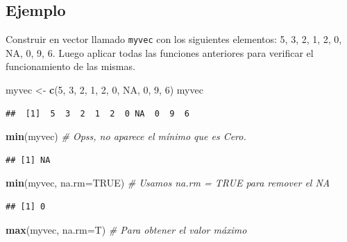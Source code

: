 \documentclass[10pt,]{krantz}
\makeatletter
\newenvironment{Shaded}{\begin{snugshade}}{\end{snugshade}}
\newcommand{\KeywordTok}[1]{\textcolor[rgb]{0.13,0.29,0.53}{\textbf{{#1}}}}
\newcommand{\DataTypeTok}[1]{\textcolor[rgb]{0.13,0.29,0.53}{{#1}}}
\newcommand{\DecValTok}[1]{\textcolor[rgb]{0.00,0.00,0.81}{{#1}}}
\newcommand{\StringTok}[1]{\textcolor[rgb]{0.31,0.60,0.02}{{#1}}}
\newcommand{\CommentTok}[1]{\textcolor[rgb]{0.56,0.35,0.01}{\textit{{#1}}}}
\newcommand{\OtherTok}[1]{\textcolor[rgb]{0.56,0.35,0.01}{{#1}}}
\newcommand{\NormalTok}[1]{{#1}}
\newenvironment{kframe}{%
\medskip{}
\setlength{\fboxsep}{.8em}
 \def\at@end@of@kframe{}%
 \ifinner\ifhmode%
  \def\at@end@of@kframe{\end{minipage}}%
  \begin{minipage}{\columnwidth}%
 \fi\fi%
 \def\FrameCommand##1{\hskip\@totalleftmargin \hskip-\fboxsep
 \colorbox{shadecolor}{##1}\hskip-\fboxsep
     \hskip-\linewidth \hskip-\@totalleftmargin \hskip\columnwidth}%
 \MakeFramed {\advance\hsize-\width
   \@totalleftmargin\z@ \linewidth\hsize
   \@setminipage}}%
 {\par\unskip\endMakeFramed%
 \at@end@of@kframe}
\renewenvironment{Shaded}{\begin{kframe}}{\end{kframe}}
\makeatother
\begin{document}
\subsection*{Ejemplo}\label{ejemplo-15}


Construir en vector llamado \texttt{myvec} con los siguientes elementos:
5, 3, 2, 1, 2, 0, NA, 0, 9, 6. Luego aplicar todas las funciones
anteriores para verificar el funcionamiento de las mismas.

\begin{Shaded}
\begin{Highlighting}[]
\NormalTok{myvec <-}\StringTok{ }\KeywordTok{c}\NormalTok{(}\DecValTok{5}\NormalTok{, }\DecValTok{3}\NormalTok{, }\DecValTok{2}\NormalTok{, }\DecValTok{1}\NormalTok{, }\DecValTok{2}\NormalTok{, }\DecValTok{0}\NormalTok{, }\OtherTok{NA}\NormalTok{, }\DecValTok{0}\NormalTok{, }\DecValTok{9}\NormalTok{, }\DecValTok{6}\NormalTok{)}
\NormalTok{myvec}
\end{Highlighting}
\end{Shaded}

\begin{verbatim}
##  [1]  5  3  2  1  2  0 NA  0  9  6
\end{verbatim}

\begin{Shaded}
\begin{Highlighting}[]
\KeywordTok{min}\NormalTok{(myvec)  }\CommentTok{# Opss, no aparece el mínimo que es Cero.}
\end{Highlighting}
\end{Shaded}

\begin{verbatim}
## [1] NA
\end{verbatim}

\begin{Shaded}
\begin{Highlighting}[]
\KeywordTok{min}\NormalTok{(myvec, }\DataTypeTok{na.rm=}\OtherTok{TRUE}\NormalTok{)  }\CommentTok{# Usamos na.rm = TRUE para remover el NA}
\end{Highlighting}
\end{Shaded}

\begin{verbatim}
## [1] 0
\end{verbatim}

\begin{Shaded}
\begin{Highlighting}[]
\KeywordTok{max}\NormalTok{(myvec, }\DataTypeTok{na.rm=}\NormalTok{T)  }\CommentTok{# Para obtener el valor máximo}
\end{Highlighting}
\end{Shaded}
\end{document}
